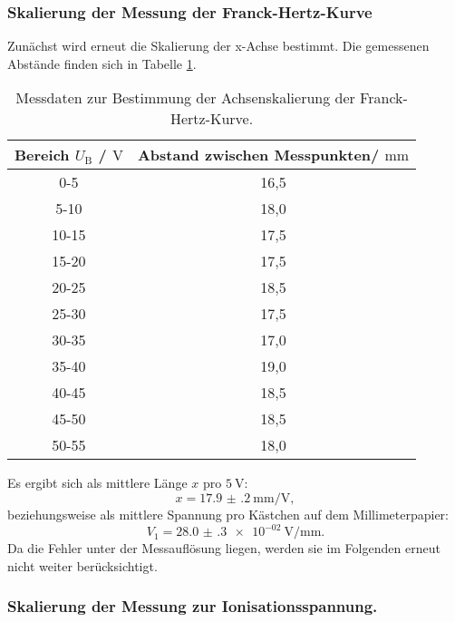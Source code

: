 \subsubsection{Skalierung der Messung der Franck-Hertz-Kurve}
Zunächst wird erneut die Skalierung der x-Achse bestimmt.
Die gemessenen Abstände finden sich in Tabelle \ref{tab:franckie}.
\begin{table}
	\centering
	\caption{Messdaten zur Bestimmung der Achsenskalierung der Franck-Hertz-Kurve.}
	\label{tab:franckie}
	\begin{tabular}{cc}
		\toprule
		Bereich $U_{\mathrm{B}}$ / $\si{\volt}$ & Abstand zwischen Messpunkten/ $\si{\milli\meter}$ \\
		\midrule
		0-5 & 16,5 \\
		5-10 & 18,0 \\
		10-15 & 17,5 \\
		15-20 & 17,5 \\
		20-25 & 18,5 \\
		25-30 & 17,5 \\
		30-35 & 17,0 \\
		35-40 & 19,0 \\
		40-45 & 18,5 \\
		45-50 & 18,5 \\
		50-55 & 18,0 \\
		\bottomrule
	\end{tabular}
\end{table}
Es ergibt sich als mittlere Länge $x$ pro $\SI{5}{\volt}$:
\begin{equation}
	x=\SI{17.9(2)}{\milli\meter\per\volt} \mathrm{,}
\end{equation}
beziehungsweise als mittlere Spannung pro Kästchen auf dem Millimeterpapier:
\begin{equation}
	V_1= \SI{28.0(3)e-02}{\volt\per\milli\meter} \mathrm{.}
\end{equation}
Da die Fehler unter der Messauflösung liegen, werden sie im Folgenden erneut nicht weiter berücksichtigt.
\subsubsection{Skalierung der Messung zur Ionisationsspannung.}

